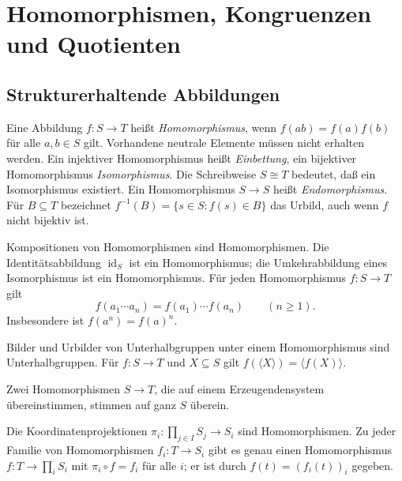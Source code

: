 \chapter{Homomorphismen, Kongruenzen und Quotienten}

\section{Strukturerhaltende Abbildungen}

\begin{definition}
Eine Abbildung $f:S\to T$ heißt \emph{Homomorphismus}, wenn
$f(ab)=f(a)f(b)$ für alle $a,b\in S$ gilt.
Vorhandene neutrale Elemente müssen nicht erhalten werden.
Ein injektiver Homomorphismus heißt \emph{Einbettung}, ein
bijektiver Homomorphismus \emph{Isomorphismus}.
Die Schreibweise $S\cong T$ bedeutet, daß ein Isomorphismus existiert.
Ein Homomorphismus $S\to S$ heißt \emph{Endomorphismus}.
Für $B\subseteq T$ bezeichnet $f^{-1}(B)=\{s\in S:f(s)\in B\}$
das Urbild, auch wenn $f$ nicht bijektiv ist.
\end{definition}

\begin{theorem}
Kompositionen von Homomorphismen sind Homomorphismen.
Die Identitätsabbildung $\operatorname{id}_S$ ist ein Homomorphismus;
die Umkehrabbildung
eines Isomorphismus ist ein Homomorphismus.
Für jeden Homomorphismus $f:S\to T$ gilt
\[
 f(a_1\cdots a_n)=f(a_1)\cdots f(a_n)\qquad(n\geq1).
\]
Insbesondere ist $f(a^n)=f(a)^n$.
\cite{harju}
\end{theorem}

\begin{theorem}
Bilder und Urbilder von Unterhalbgruppen unter einem Homomorphismus
sind Unterhalbgruppen. Für $f:S\to T$ und $X\subseteq S$ gilt $f(\langle X\rangle)=\langle f(X)\rangle$.

Zwei Homomorphismen $S\to T$, die auf einem Erzeugendensystem
übereinstimmen, stimmen auf ganz $S$ überein.
\cite{harju,gould}
\end{theorem}

\begin{theorem}
Die Koordinatenprojektionen $\pi_i:\prod_{j\in I}S_j\to S_i$
sind Homomorphismen. Zu jeder Familie von Homomorphismen
$f_i:T\to S_i$ gibt es genau einen Homomorphismus
$f:T\to\prod_i S_i$ mit $\pi_i\circ f=f_i$ für alle $i$;
er ist durch $f(t)=(f_i(t))_i$ gegeben.
\cite{howie}
\end{theorem}

